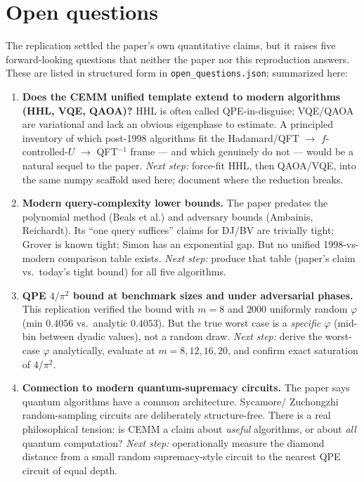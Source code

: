 \section{Open questions}
The replication settled the paper's own quantitative claims, but it raises
five forward-looking questions that neither the paper nor this reproduction
answers. These are listed in structured form in
\texttt{open\_questions.json}; summarized here:

\begin{enumerate}
    \item \textbf{Does the CEMM unified template extend to modern algorithms
          (HHL, VQE, QAOA)?} HHL is often called QPE-in-disguise; VQE/QAOA
          are variational and lack an obvious eigenphase to estimate. A
          principled inventory of which post-1998 algorithms fit the
          Hadamard/QFT $\to$ $f$-controlled-$U$ $\to$ QFT$^{-1}$ frame ---
          and which genuinely do not --- would be a natural sequel to the
          paper. \emph{Next step:} force-fit HHL, then QAOA/VQE, into the
          same numpy scaffold used here; document where the reduction breaks.

    \item \textbf{Modern query-complexity lower bounds.} The paper predates
          the polynomial method (Beals et al.) and adversary bounds
          (Ambainis, Reichardt). Its ``one query suffices'' claims for DJ/BV
          are trivially tight; Grover is known tight; Simon has an
          exponential gap. But no unified 1998-vs-modern comparison table
          exists. \emph{Next step:} produce that table (paper's claim vs.\
          today's tight bound) for all five algorithms.

    \item \textbf{QPE $4/\pi^{2}$ bound at benchmark sizes and under
          adversarial phases.} This replication verified the bound with $m=8$
          and $2000$ uniformly random $\varphi$ (min $0.4056$ vs.\ analytic
          $0.4053$). But the true worst case is a \emph{specific} $\varphi$
          (mid-bin between dyadic values), not a random draw. \emph{Next
          step:} derive the worst-case $\varphi$ analytically, evaluate at
          $m=8,12,16,20$, and confirm exact saturation of $4/\pi^{2}$.

    \item \textbf{Connection to modern quantum-supremacy circuits.} The
          paper says quantum algorithms have a common architecture. Sycamore/
          Zuchongzhi random-sampling circuits are deliberately structure-free.
          There is a real philosophical tension: is CEMM a claim about
          \emph{useful} algorithms, or about \emph{all} quantum computation?
          \emph{Next step:} operationally measure the diamond distance from a
          small random supremacy-style circuit to the nearest QPE circuit of
          equal depth.


\end{enumerate}
